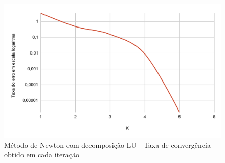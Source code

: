 \begin{figure}[!htp]
    \centering
    \includegraphics[scale=.7]{img/nr-opt-convergencia..pdf}
    \caption{Método de Newton com decomposição LU - Taxa de convergência obtido em cada iteração}
    \label{img:opt-LU-convergencia}
\end{figure}